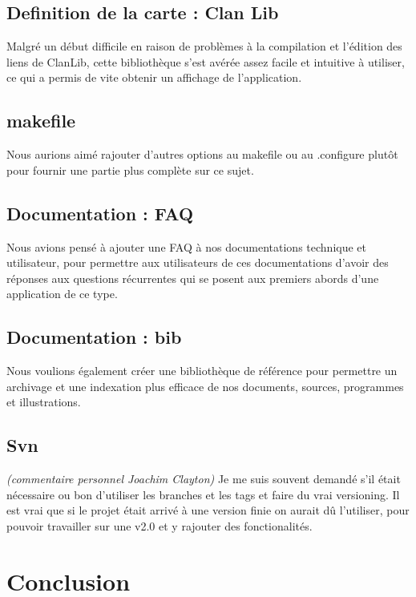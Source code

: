 \documentclass[a4paper 12pts]{article}
\begin{document}
\subsection{Definition de la carte : Clan Lib}
Malgré un début difficile en raison de problèmes à la compilation et l'édition des liens de ClanLib, cette bibliothèque s'est avérée assez facile et intuitive à utiliser, ce qui a permis de vite obtenir un affichage de l'application.

\subsection{makefile}
Nous aurions aimé rajouter d'autres options au makefile ou au .configure plutôt pour fournir une partie plus complète sur ce sujet.

\subsection{Documentation : FAQ}

Nous avions pensé à ajouter une FAQ à nos documentations technique et utilisateur, pour permettre aux utilisateurs de ces documentations d'avoir des réponses aux questions récurrentes qui se posent aux premiers abords d'une application de ce type.

\subsection{Documentation : bib}

Nous voulions également créer une bibliothèque de référence pour permettre un archivage et une indexation plus efficace de nos documents, sources, programmes et illustrations.

\subsection{Svn}

\emph{(commentaire personnel Joachim Clayton)}
Je me suis souvent demandé s'il était nécessaire ou bon d'utiliser les branches et les tags et faire du vrai versioning. 
Il est vrai que si le projet était arrivé à une version finie on aurait dû l'utiliser, pour pouvoir travailler sur une v2.0 et y rajouter des fonctionalités.



\section{Conclusion}
\end{document}
